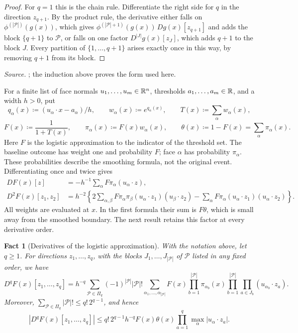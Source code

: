 \documentclass[11pt,letterpaper]{article}
\theoremstyle{plain}
\newtheorem{fact}{Fact}[section]
\begin{document}
\begin{proof}
For \(q=1\) this is the chain rule. Differentiate the right side for \(q\)
in the direction \(z_{q+1}\). By the product rule, the derivative either
falls on \(\phi^{(|\mathcal P|)}(g(x))\), which gives
\(\phi^{(|\mathcal P|+1)}(g(x))\,Dg(x)[z_{q+1}]\) and adds the block
\(\{q+1\}\) to \(\mathcal P\), or falls on one factor
\(D^{|J|}g(x)[z_J]\), which adds \(q+1\) to the block \(J\). Every partition
of \(\{1,\ldots,q+1\}\) arises exactly once in this way, by removing
\(q+1\) from its block.
\end{proof}

\emph{Source.} ; the induction above proves the form used here.

For a finite list of face normals \(u_1,\ldots,u_m\in\mathbb R^n\), thresholds
\(a_1,\ldots,a_m\in\mathbb R\), and a width \(h>0\), put
\[
 q_\alpha(x)\coloneqq(u_\alpha\cdot x-a_\alpha)/h,\qquad
 w_\alpha(x)\coloneqq e^{q_\alpha(x)},\qquad T(x)\coloneqq\sum_\alpha w_\alpha(x),
\]
\[
 F(x)\coloneqq\frac1{1+T(x)},\qquad
 \pi_\alpha(x)\coloneqq F(x)w_\alpha(x),\qquad
 \theta(x)\coloneqq1-F(x)=\sum_\alpha\pi_\alpha(x).
\]
Here \(F\) is the logistic approximation to the indicator of the
threshold set. The baseline outcome has weight one and probability
\(F\); face \(\alpha\) has probability \(\pi_\alpha\). These
probabilities describe the smoothing formula, not the original event.
Differentiating once and twice gives
\begin{align*}
 DF(x)[z]&=-h^{-1}\sum_\alpha F\pi_\alpha(u_\alpha\cdot z),\\
 D^2F(x)[z_1,z_2]
 &=h^{-2}\left\{2\sum_{\alpha,\beta}F\pi_\alpha\pi_\beta
       (u_\alpha\cdot z_1)(u_\beta\cdot z_2)
       -\sum_\alpha F\pi_\alpha
       (u_\alpha\cdot z_1)(u_\alpha\cdot z_2)\right\}.
\end{align*}
All weights are evaluated at \(x\). In the first formula their sum is
\(F\theta\), which is small away from the smoothed boundary.
The next result retains this factor at every derivative order.

\begin{fact}[Derivatives of the logistic approximation]\label{tb:logistic}
With the notation above, let \(q\ge1\).
For directions \(z_1,\ldots,z_q\), with the blocks \(J_1,\ldots,J_{|\mathcal P|}\)
of \(\mathcal P\) listed in any fixed order, we have
\[
 D^qF(x)[z_1,\ldots,z_q]
 =h^{-q}\sum_{\mathcal P\in\Pi_q}(-1)^{|\mathcal P|}|\mathcal P|!
 \sum_{\alpha_1,\ldots,\alpha_{|\mathcal P|}}
 F(x)\prod_{b=1}^{|\mathcal P|}\pi_{\alpha_b}(x)
 \prod_{b=1}^{|\mathcal P|}\prod_{a\in J_b}(u_{\alpha_b}\cdot z_a).
\]
Moreover, \(\sum_{\mathcal P\in\Pi_q}|\mathcal P|!\le q!\,2^{q-1}\), and hence
\[
 |D^qF(x)[z_1,\ldots,z_q]|
 \le q!\,2^{q-1}h^{-q}F(x)\theta(x)
       \prod_{a=1}^q\max_\alpha|u_\alpha\cdot z_a|.
\]
\end{fact}
\end{document}
